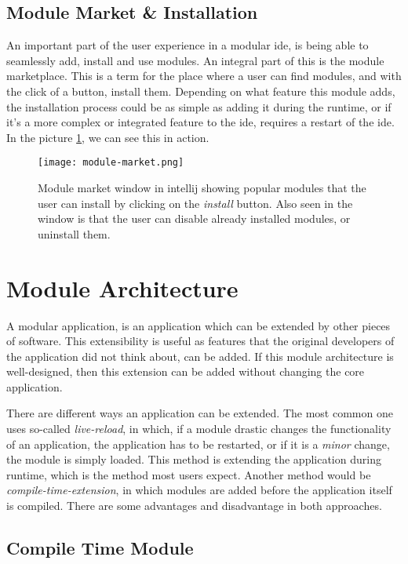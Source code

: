 \subsection{Module Market \& Installation}

An important part of the user experience in a modular \gls*{ide}, is being able
to seamlessly add, install and use modules. An integral part of this is the
module marketplace. This is a term for the place where a user can find modules,
and with the click of a button, install them. Depending on what feature this
module adds, the installation process could be as simple as adding it during the
runtime, or if it's a more complex or integrated feature to the \gls*{ide},
requires a restart of the \gls*{ide}. In the picture \ref{pic:market}, we can see
this in action.

\begin{figure}
  \centering
  \texttt{[image: module-market.png]}
  \caption{
    Module market window in \gls*{intellij} showing popular modules that the user can
    install by clicking on the \textit{install} button. Also seen in the window is
    that the user can disable already installed modules, or uninstall them.
  }
  \label{pic:market}
\end{figure}

\section{Module Architecture}

A modular application, is an application which can be extended by other pieces
of software. This extensibility is useful as features that the original
developers of the application did not think about, can be added. If this module
architecture is well-designed, then this extension can be added without changing
the core application.

There are different ways an application can be extended. The most common one
uses so-called \textit{live-reload}, in which, if a module drastic changes the
functionality of an application, the application has to be restarted, or if it
is a \textit{minor} change, the module is simply loaded. This method is
extending the application during runtime, which is the method most users
expect. Another method would be \textit{compile-time-extension}, in which
modules are added before the application itself is compiled. There are some
advantages and disadvantage in both approaches.

\subsection{Compile Time Module}


